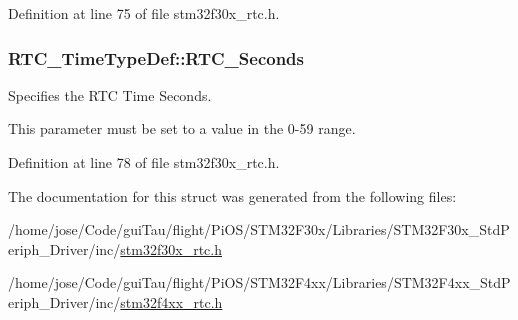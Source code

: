 Definition at line 75 of file stm32f30x\-\_\-rtc.\-h.

\hypertarget{struct_r_t_c___time_type_def_a7c2a8d308f1cc38a08d557f6560b52c7}{
\subsubsection[{R\-T\-C\-\_\-\-Seconds}]{ R\-T\-C\-\_\-\-Time\-Type\-Def\-::\-R\-T\-C\-\_\-\-Seconds}}\label{struct_r_t_c___time_type_def_a7c2a8d308f1cc38a08d557f6560b52c7}
\begin{DoxyVerb}       Specifies the RTC Time Seconds.
\end{DoxyVerb}
 This parameter must be set to a value in the 0-\/59 range. 

Definition at line 78 of file stm32f30x\-\_\-rtc.\-h.



The documentation for this struct was generated from the following files\-:\begin{DoxyCompactItemize}
\item 
/home/jose/\-Code/gui\-Tau/flight/\-Pi\-O\-S/\-S\-T\-M32\-F30x/\-Libraries/\-S\-T\-M32\-F30x\-\_\-\-Std\-Periph\-\_\-\-Driver/inc/\hyperlink{stm32f30x__rtc_8h}{stm32f30x\-\_\-rtc.\-h}\item 
/home/jose/\-Code/gui\-Tau/flight/\-Pi\-O\-S/\-S\-T\-M32\-F4xx/\-Libraries/\-S\-T\-M32\-F4xx\-\_\-\-Std\-Periph\-\_\-\-Driver/inc/\hyperlink{stm32f4xx__rtc_8h}{stm32f4xx\-\_\-rtc.\-h}\end{DoxyCompactItemize}
